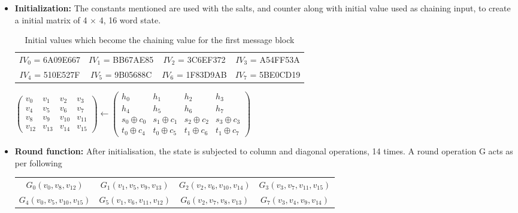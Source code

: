 \begin{itemize}
    \item {\bf Initialization: } The constants mentioned are used with the salts, and counter along with initial
    value used as chaining input, to create a initial matrix of 4 $\times$ 4, 16 word state.

      \begin{table}[h]
        \begin{center}
          \begin{tabular}{ *{4}{c}}
            $IV_{0}$ = 6A09E667 & $IV_{1}$ = BB67AE85 & $IV_{2}$ = 3C6EF372 & $IV_{3}$ = A54FF53A \\
            $IV_{4}$ = 510E527F & $IV_{5}$ = 9B05688C & $IV_{6}$ = 1F83D9AB & $IV_{7}$ = 5BE0CD19 \\
          \end{tabular}
          \caption{Initial values which become the chaining value for the first message block \cite{00002}}
        \end{center}
      \end{table}
      
    \begin{center}
    $\begin{pmatrix} v_{0} & v_{1} & v_{2} & v_{3} \\ v_{4} & v_{5} & v_{6} & v_{7} \\
                     v_{8} & v_{9} & v_{10} & v_{11} \\ v_{12} & v_{13} & v_{14} & v_{15}\end{pmatrix} 
    \gets
    \begin{pmatrix} h_{0} & h_{1} & h_{2} & h_{3} \\ h_{4} & h_{5} & h_{6} & h_{7} \\
       s_{0} \oplus c_{0} & s_{1} \oplus c_{1} & s_{2} \oplus c_{2} & s_{3} \oplus c_{3} \\ 
       t_{0} \oplus c_{4} & t_{0} \oplus c_{5} & t_{1} \oplus c_{6} & t_{1} \oplus c_{7} \end{pmatrix}$
    \end{center}

    \item {\bf Round function:} After initialisation, the state is subjected to column and diagonal operations, 14
    times. A round operation G acts as per following

    \begin{table}[h]
      \begin{center}
        \begin{tabular}{ *{4}{c}}
        $ G_{0}(v_{0}, v_{8}, v_{12})$ & $G_{1}(v_{1}, v_{5}, v_{9}, v_{13})$ & $G_{2}(v_{2}, v_{6}, v_{10}, v_{14})$ & $G_{3}(v_{3}, v_{7}, v_{11}, v_{15}) $\\
 $G_{4}(v_{0}, v_{5}, v_{10}, v_{15})$ & $G_{5}(v_{1}, v_{6}, v_{11}, v_{12})$ & $G_{6}(v_{2}, v_{7}, v_{8}, v_{13})$ & $G_{7}(v_{3}, v_{4}, v_{9}, v_{14})$
        \end{tabular}
      \end{center}
    \end{table}


\end{itemize}
